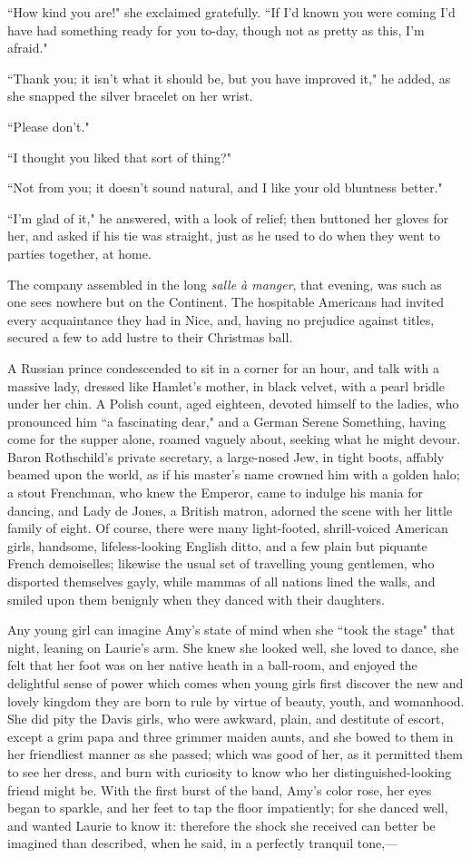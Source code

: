 ``How kind you are!" she exclaimed gratefully. ``If I'd
known you were coming I'd have had something ready for
you to-day, though not as pretty as this, I'm afraid."

``Thank you; it isn't what it should be, but you have
improved it," he added, as she snapped the silver bracelet on her wrist.

``Please don't."

``I thought you liked that sort of thing?"

``Not from you; it doesn't sound natural, and I like your
old bluntness better."

``I'm glad of it," he answered, with a look of relief;
then buttoned her gloves for her, and asked if his tie was straight,
just as he used to do when they went to parties together, at home.

The company assembled in the long \emph{salle à manger}, that evening,
was such as one sees nowhere but on the Continent. The hospitable
Americans had invited every acquaintance they had in Nice, and, having
no prejudice against titles, secured a few to add lustre to their
Christmas ball.

A Russian prince condescended to sit in a corner for an hour, and talk
with a massive lady, dressed like Hamlet's mother, in
black velvet, with a pearl bridle under her chin. A Polish count, aged
eighteen, devoted himself to the ladies, who pronounced him ``a
fascinating dear," and a German Serene Something, having come for the
supper alone, roamed vaguely about, seeking what he might devour. Baron
Rothschild's private secretary, a large-nosed Jew, in
tight boots, affably beamed upon the world, as if his
master's name crowned him with a golden halo; a stout
Frenchman, who knew the Emperor, came to indulge his mania for dancing,
and Lady de Jones, a British matron, adorned the scene with her little
family of eight. Of course, there were many light-footed, shrill-voiced
American girls, handsome, lifeless-looking English ditto, and a few
plain but piquante French demoiselles; likewise the usual set of
travelling young gentlemen, who disported themselves gayly, while mammas
of all nations lined the walls, and smiled upon them benignly when they
danced with their daughters.

Any young girl can imagine Amy's state of mind when she
``took the stage" that night, leaning on Laurie's arm.
She knew she looked well, she loved to dance, she felt that her foot was
on her native heath in a ball-room, and enjoyed the delightful sense of
power which comes when young girls first discover the new and lovely
kingdom they are born to rule by virtue of beauty, youth, and womanhood.
She did pity the Davis girls, who were awkward, plain, and destitute of
escort, except a grim papa and three grimmer maiden aunts, and she bowed
to them in her friendliest manner as she passed; which was good of her,
as it permitted them to see her dress, and burn with curiosity to know
who her distinguished-looking friend might be. With the first burst of
the band, Amy's color rose, her eyes began to sparkle,
and her feet to tap the floor impatiently; for she danced well, and
wanted Laurie to know it: therefore the shock she received can better be
imagined than described, when he said, in a perfectly tranquil tone,---

